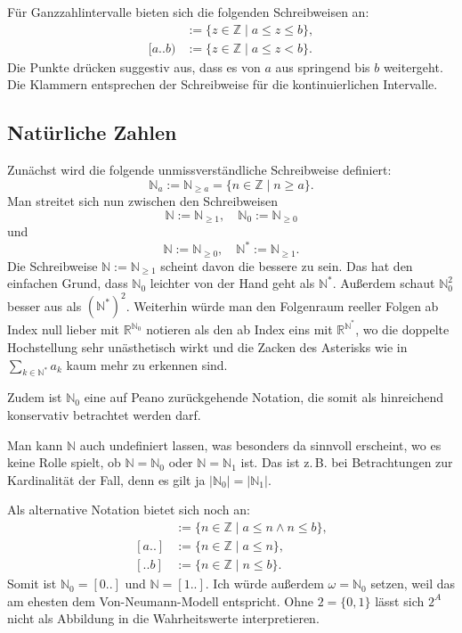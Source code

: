 \documentclass[a4paper,11pt,fleqn,twoside,BCOR=16mm]{scrartcl}
\newcommand{\N}{\mathbb N}
\newcommand{\Z}{\mathbb Z}
\newcommand{\R}{\mathbb R}
\begin{document}
Für Ganzzahlintervalle bieten sich die folgenden Schreibweisen an:
\begin{align}
[a..b] &:= \{z\in\Z\mid a\le z\le b\},\\
[a..b) &:= \{z\in\Z\mid a\le z<b\}.
\end{align}
Die Punkte drücken suggestiv aus, dass es von $a$ aus springend
bis $b$ weitergeht. Die Klammern entsprechen der Schreibweise
für die kontinuierlichen Intervalle.

\subsection{Natürliche Zahlen}
Zunächst wird die folgende unmissverständliche Schreibweise definiert:%
\begin{equation}
\N_a := \N_{\ge a} = \{n\in\Z\mid n\ge a\}.
\end{equation}
Man streitet sich nun zwischen den Schreibweisen
\begin{equation}
\N := \N_{\ge 1},\quad \N_0 := \N_{\ge 0}
\end{equation}
und
\begin{equation}
\N := \N_{\ge 0},\quad \N^* := \N_{\ge 1}.
\end{equation}
Die Schreibweise $\N:=\N_{\ge 1}$ scheint davon die bessere zu sein.
Das hat den einfachen Grund, dass $\N_0$ leichter von der Hand
geht als $\N^*$. Außerdem schaut $\N_0^2$ besser aus
als $(\N^*)^2$. Weiterhin würde man den Folgenraum reeller Folgen
ab Index null lieber mit $\R^{\N_0}$ notieren als den ab Index eins
mit $\R^{\N^*}$, wo die doppelte
Hochstellung sehr unästhetisch wirkt und die Zacken des Asterisks
wie in $\sum_{k\in\N^*} a_k$ kaum mehr zu erkennen sind.

Zudem ist $\N_0$ eine auf Peano
zurückgehende Notation, die somit als hinreichend konservativ
betrachtet werden darf.

Man kann $\N$ auch undefiniert lassen, was besonders da sinnvoll
erscheint, wo es keine Rolle spielt, ob $\N=\N_0$ oder $\N=\N_1$
ist. Das ist z.\,B. bei Betrachtungen zur Kardinalität der Fall,
denn es gilt ja $|\N_0|=|\N_1|$.

Als alternative Notation bietet sich noch an:
\begin{align}
[a..b] &:= \{n\in\Z\mid a\le n\wedge n\le b\},\\
[a..]  &:= \{n\in\Z\mid a\le n\},\\
[..b]  &:= \{n\in\Z\mid n\le b\}.
\end{align}
Somit ist $\N_0=[0..]$ und $\N=[1..]$.
Ich würde außerdem $\omega=\N_0$ setzen, weil das am ehesten
dem Von-Neumann-Modell entspricht. Ohne $2=\{0,1\}$ lässt
sich $2^A$ nicht als Abbildung in die Wahrheitswerte
interpretieren.
\end{document}
